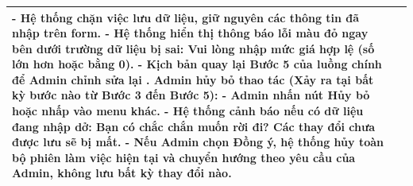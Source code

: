 \begin{longtable}{|>{\centering\arraybackslash}m{3cm}|m{13.7cm}|}
- Hệ thống chặn việc lưu dữ liệu, giữ nguyên các thông tin đã nhập trên form. \newline
- Hệ thống hiển thị thông báo lỗi màu đỏ ngay bên dưới trường dữ liệu bị sai: Vui lòng nhập mức giá hợp lệ (số lớn hơn hoặc bằng 0). \newline
- Kịch bản quay lại Bước 5 của luồng chính để Admin chỉnh sửa lại \newline
2. Admin hủy bỏ thao tác (Xảy ra tại bất kỳ bước nào từ Bước 3 đến Bước 5): \newline
- Admin nhấn nút Hủy bỏ hoặc nhấp vào menu khác. \newline
- Hệ thống cảnh báo nếu có dữ liệu đang nhập dở: Bạn có chắc chắn muốn rời đi? Các thay đổi chưa được lưu sẽ bị mất. \newline
- Nếu Admin chọn Đồng ý, hệ thống hủy toàn bộ phiên làm việc hiện tại và chuyển hướng theo yêu cầu của Admin, không lưu bất kỳ thay đổi nào.\\ \hline
\end{longtable}
\endgroup

